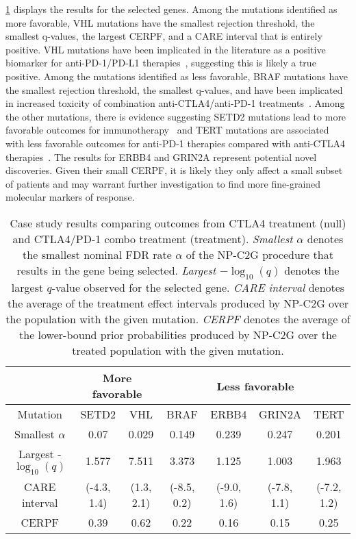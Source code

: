 \cref{table:case study} displays the results for the selected genes. Among the mutations identified as more favorable, VHL mutations have the smallest rejection threshold, the smallest q-values, the largest CERPF, and a CARE interval that is entirely positive. VHL mutations have been implicated in the literature as a positive biomarker for anti-PD-1/PD-L1 therapies~\citep{meng:etal:2024:vhl-loss-antitumor-immunity}, suggesting this is likely a true positive. Among the mutations identified as less favorable, BRAF mutations have the smallest rejection threshold, the smallest q-values, and have been implicated in increased toxicity of combination anti-CTLA4/anti-PD-1 treatments~\citep{piresdasilva:etal:2022:braf-toxicity-pd1}. Among the other mutations, there is evidence suggesting SETD2 mutations lead to more favorable outcomes for immunotherapy~\citep{jee:etal:2024:msk-chord,lu:etal:2021:SETD2-immunotherapy} and TERT mutations are associated with less favorable outcomes for anti-PD-1 therapies compared with anti-CTLA4 therapies~\citep{li:etal:2020:tert-immunotherapy}. The results for ERBB4 and GRIN2A represent potential novel discoveries. Given their small CERPF, it is likely they only affect a small subset of patients and may warrant further investigation to find more fine-grained molecular markers of response.

\begin{table}
\centering
%
%
%
%
%
%
%
%
%
%
%
%
%
\begin{tabular}{|c|c|c|c|c|c|c|}
\hline
& \multicolumn{2}{|c|}{More favorable} & \multicolumn{4}{|c|}{Less favorable} \\
\hline
Mutation & SETD2 & VHL & BRAF & ERBB4 & GRIN2A & TERT \\
\hline
Smallest $\alpha$ & 0.07 & 0.029 & 0.149 & 0.239 & 0.247 & 0.201 \\
\hline
Largest -$\log_{10}(q)$ & 1.577 & 7.511 & 3.373 & 1.125 & 1.003 & 1.963 \\
\hline
CARE interval & (-4.3, 1.4) & (1.3, 2.1) & (-8.5, 0.2) & (-9.0, 1.6) & (-7.8, 1.1) & (-7.2, 1.2) \\
\hline
CERPF & 0.39 & 0.62 & 0.22 & 0.16 & 0.15 & 0.25\\
\hline
\end{tabular}
\caption{Case study results comparing outcomes from CTLA4 treatment (null) and CTLA4/PD-1 combo treatment (treatment). \emph{Smallest $\alpha$} denotes the smallest nominal FDR rate $\alpha$ of the NP-C2G procedure that results in the gene being selected. \emph{Largest $- \log_{10}(q)$} denotes the largest $q$-value observed for the selected gene. \emph{CARE interval} denotes the average of the treatment effect intervals produced by NP-C2G over the population with the given mutation. \emph{CERPF} denotes the average of the lower-bound prior probabilities produced by NP-C2G over the treated population with the given mutation.}
\label{table:case study}
\end{table}


